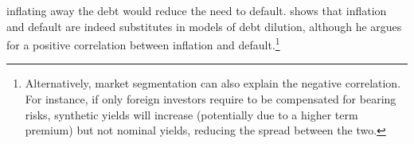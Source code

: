 {%
inflating away the debt would reduce the need to default.
\cite{Galli:2020} shows that inflation and default are indeed substitutes in models of debt dilution, although he argues for a positive correlation between inflation and default.\footnote{ Alternatively, market segmentation %
	can also explain the negative correlation. For instance, if only foreign investors require to be compensated for bearing risks, synthetic yields will increase (potentially due to a higher term premium) but not nominal yields, reducing the spread between the two.}


}
